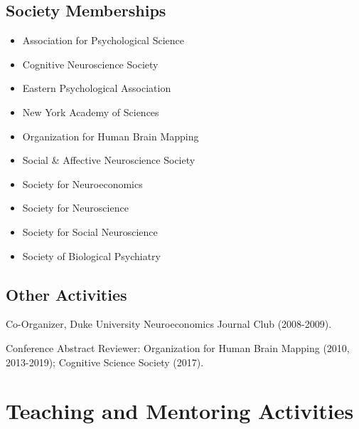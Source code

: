 \documentclass[11pt, letterpaper]{article}
\begin{document}
\subsection*{Society Memberships}
\begin{multicols}{2}
\begin{itemize}[noitemsep]
\item Association for Psychological Science
\item Cognitive Neuroscience Society
\item Eastern Psychological Association
\item New York Academy of Sciences
\item Organization for Human Brain Mapping
\item Social \& Affective Neuroscience Society
\item Society for Neuroeconomics
\item Society for Neuroscience
\item Society for Social Neuroscience
\item Society of Biological Psychiatry
\end{itemize}
\end{multicols}

\subsection*{Other Activities}
\begin{hangparas}{.5in}{1}
Co-Organizer, Duke University Neuroeconomics Journal Club (2008-2009).

Conference Abstract Reviewer: Organization for Human Brain Mapping (2010, 2013-2019); Cognitive Science Society (2017). \\

\end{hangparas}



\vspace{.2cm}
\section*{Teaching and Mentoring Activities}
\end{document}
